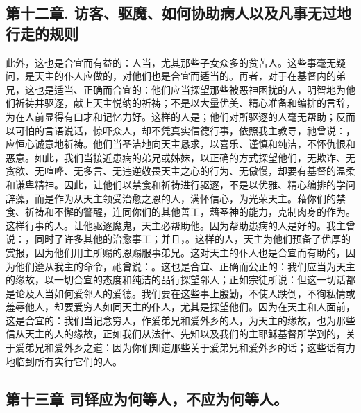
\subsection{第十二章. 访客、驱魔、如何协助病人以及凡事无过地行走的规则}

此外，这也是合宜而有益的：人当，尤其那些子女众多的贫苦人。这些事毫无疑问，是天主的仆人应做的，对他们也是合宜而适当的。再者，对于在基督内的弟兄，这也是适当、正确而合宜的：他们应当探望那些被恶神困扰的人，明智地为他们祈祷并驱逐，献上天主悦纳的祈祷；不是以大量优美、精心准备和编排的言辞，为在人前显得有口才和记忆力好。这样的人是；他们对所驱逐的人毫无帮助；反而以可怕的言语说话，惊吓众人，却不凭真实信德行事，依照我主教导，祂曾说：，应恒心诚意地祈祷。他们当圣洁地向天主恳求，以喜乐、谨慎和纯洁，不怀仇恨和恶意。如此，我们当接近患病的弟兄或姊妹，以正确的方式探望他们，无欺诈、无贪欲、无喧哗、无多言、无违逆敬畏天主之心的行为、无傲慢，却要有基督的温柔和谦卑精神。因此，让他们以禁食和祈祷进行驱逐，不是以优雅、精心编排的学问辞藻，而是作为从天主领受治愈之恩的人，满怀信心，为光荣天主。藉你们的禁食、祈祷和不懈的警醒，连同你们的其他善工，藉圣神的能力，克制肉身的作为。这样行事的人。让他驱逐魔鬼，天主必帮助他。因为帮助患病的人是好的。我主曾说：，同时了许多其他的治愈事工；并且，。这样的人，天主为他们预备了优厚的赏报，因为他们用主所赐的恩赐服事弟兄。这对天主的仆人也是合宜而有助的，因为他们遵从我主的命令，祂曾说：。这也是合宜、正确而公正的：我们应当为天主的缘故，以一切合宜的态度和纯洁的品行探望邻人；正如宗徒所说：但这一切话都是论及人当如何爱邻人的爱德。我们要在这些事上殷勤，不使人跌倒，不徇私情或羞辱他人，却要爱穷人如同天主的仆人，尤其是探望他们。因为在天主和人面前，这是合宜的：我们当记念穷人，作爱弟兄和爱外乡的人，为天主的缘故，也为那些信从天主的人的缘故，正如我们从法律、先知以及我们的主耶稣基督所学到的，关于爱弟兄和爱外乡之道：因为你们知道那些关于爱弟兄和爱外乡的话；这些话有力地临到所有实行它们的人。\par


\subsection{第十三章 司铎应为何等人，不应为何等人。}

